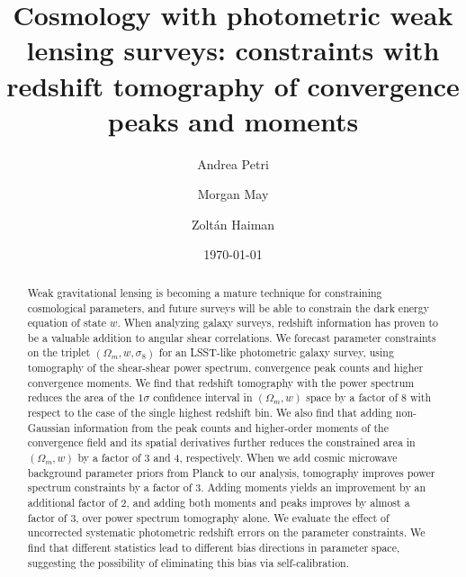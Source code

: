 \documentclass[reprint,aps,prd,superscriptaddress,showkeys,showpacs]{revtex4-1}
\begin{document}
\title{Cosmology with photometric weak lensing surveys: constraints with redshift tomography of convergence peaks and moments}

\author{Andrea Petri}

\author{Morgan May}

\author{Zolt\'an Haiman}

\date{\today}

\label{firstpage}

\begin{abstract}
Weak gravitational lensing is becoming a mature technique for
constraining cosmological parameters, and future surveys will be able
to constrain the dark energy equation of state $w$. When analyzing
galaxy surveys, redshift information has proven to be a valuable
addition to angular shear correlations. We forecast parameter
constraints on the triplet $(\Omega_m,w,\sigma_8)$ for an LSST-like
photometric galaxy survey, using tomography of the shear-shear power
spectrum, convergence peak counts and higher convergence moments. We
find that redshift tomography with the power spectrum reduces the area
of the $1\sigma$ confidence interval in $(\Omega_m,w)$ space by a
factor of 8 with respect to the case of the single highest redshift
bin. We also find that adding non-Gaussian information from the peak
counts and higher-order moments of the convergence field and its
spatial derivatives further reduces the constrained area in
$(\Omega_m,w)$ by a factor of 3 and 4, respectively. When we add
cosmic microwave background parameter priors from Planck to our
analysis, tomography improves power spectrum constraints by a factor
of 3. Adding moments yields an improvement by an additional factor of
2, and adding both moments and peaks improves by almost a factor of 3,
over power spectrum tomography alone. We evaluate the effect of
uncorrected systematic photometric redshift errors on the parameter
constraints. We find that different statistics lead to different bias
directions in parameter space, suggesting the possibility of
eliminating this bias via self-calibration. 
\end{abstract}


\end{document}
